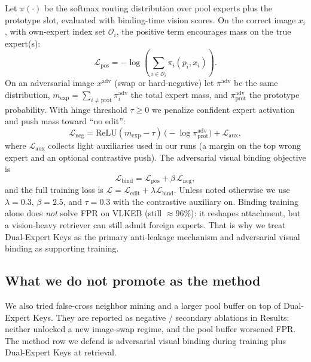\documentclass[letterpaper]{article} %
\begin{document}
Let $\pi(\cdot)$ be the softmax routing distribution over pool experts plus the prototype slot, evaluated with binding-time vision scores.
On the correct image $x_i$, with own-expert index set $\mathcal{O}_i$, the positive term encourages mass on the true expert(s):
\begin{equation}
\mathcal{L}_{\mathrm{pos}}
=
-\log\!\left(\sum_{i\in\mathcal{O}_i}\pi_i(p_i,x_i)\right).
\label{eq:avbt-pos}
\end{equation}
On an adversarial image $x^{\mathrm{adv}}$ (swap or hard-negative) let $\pi^{\mathrm{adv}}$ be the same distribution, $m_{\mathrm{exp}}=\sum_{i\neq\mathrm{prot}}\pi^{\mathrm{adv}}_i$ the total expert mass, and $\pi^{\mathrm{adv}}_{\mathrm{prot}}$ the prototype probability.
With hinge threshold $\tau\!\ge\!0$ we penalize confident expert activation and push mass toward ``no edit'':
\begin{equation}
\mathcal{L}_{\mathrm{neg}}
=
\mathrm{ReLU}\!\left(m_{\mathrm{exp}}-\tau\right)\,
\bigl(-\log\pi^{\mathrm{adv}}_{\mathrm{prot}}\bigr)
+
\mathcal{L}_{\mathrm{aux}},
\label{eq:avbt-neg}
\end{equation}
where $\mathcal{L}_{\mathrm{aux}}$ collects light auxiliaries used in our runs (a margin on the top wrong expert and an optional contrastive push).
The adversarial visual binding objective is
\begin{equation}
\mathcal{L}_{\mathrm{bind}}
=
\mathcal{L}_{\mathrm{pos}}
+
\beta\,\mathcal{L}_{\mathrm{neg}},
\label{eq:avbt}
\end{equation}
and the full training loss is $\mathcal{L}=\mathcal{L}_{\mathrm{edit}}+\lambda\mathcal{L}_{\mathrm{bind}}$.
Unless noted otherwise we use $\lambda{=}0.3$, $\beta{=}2.5$, and $\tau{=}0.3$ with the contrastive auxiliary on.
Binding training alone does \emph{not} solve FPR on VLKEB (still $\approx\!96\%$): it reshapes attachment, but a vision-heavy retriever can still admit foreign experts.
That is why we treat Dual-Expert Keys as the primary anti-leakage mechanism and adversarial visual binding as supporting training.

\subsection{What we do not promote as the method}
We also tried false-cross neighbor mining and a larger pool buffer on top of Dual-Expert Keys.
They are reported as negative / secondary ablations in Results: neither unlocked a new image-swap regime, and the pool buffer worsened FPR.
The method row we defend is adversarial visual binding during training plus Dual-Expert Keys at retrieval.
\end{document}

